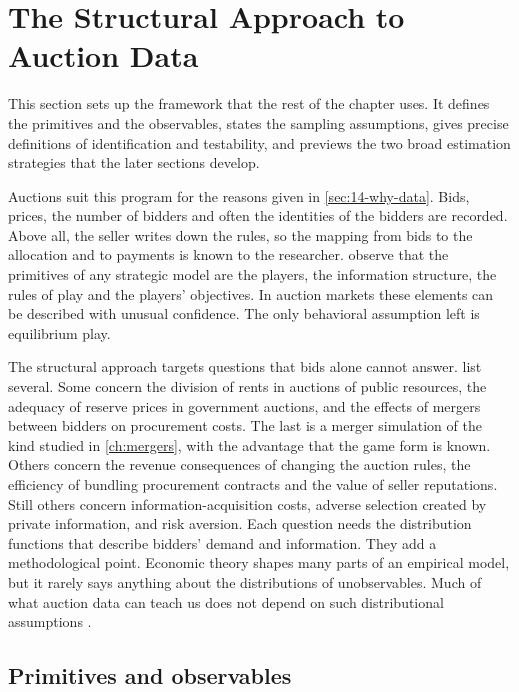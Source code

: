 \section{The Structural Approach to Auction Data}\label{sec:15-approach}

This section sets up the framework that the rest of the chapter uses. It defines the primitives and the
observables, states the sampling assumptions, gives precise definitions of identification and testability, and
previews the two broad estimation strategies that the later sections develop.

Auctions suit this program for the reasons given in \cref{sec:14-why-data}. Bids, prices, the number of bidders
and often the identities of the bidders are recorded. Above all, the seller writes down the rules, so the mapping
from bids to the allocation and to payments is known to the researcher. \citet[Section~1]{AtheyHaile2007} observe
that the primitives of any strategic model are the players, the information structure, the rules of play and the
players' objectives. In auction markets these elements can be described with unusual confidence. The only
behavioral assumption left is equilibrium play.

The structural approach targets questions that bids alone cannot answer. \citet[Section~1]{AtheyHaile2007} list
several. Some concern the division of rents in auctions of public resources, the adequacy of reserve prices in
government auctions, and the effects of mergers between bidders on procurement costs. The last is a merger
simulation of the kind studied in \cref{ch:mergers}, with the advantage that the game form is known. Others concern the
revenue consequences of changing the auction rules, the efficiency of bundling procurement contracts and the value
of seller reputations. Still others concern information-acquisition costs, adverse selection created by private
information, and risk aversion. Each question needs the distribution functions that describe bidders' demand and information. They
add a methodological point. Economic theory shapes many parts of an empirical model, but it rarely says anything
about the distributions of unobservables. Much of what auction data can teach us does not depend on such
distributional assumptions \citep[Section~1]{AtheyHaile2007}.

\subsection{Primitives and observables}\label{sec:15-primitives}

